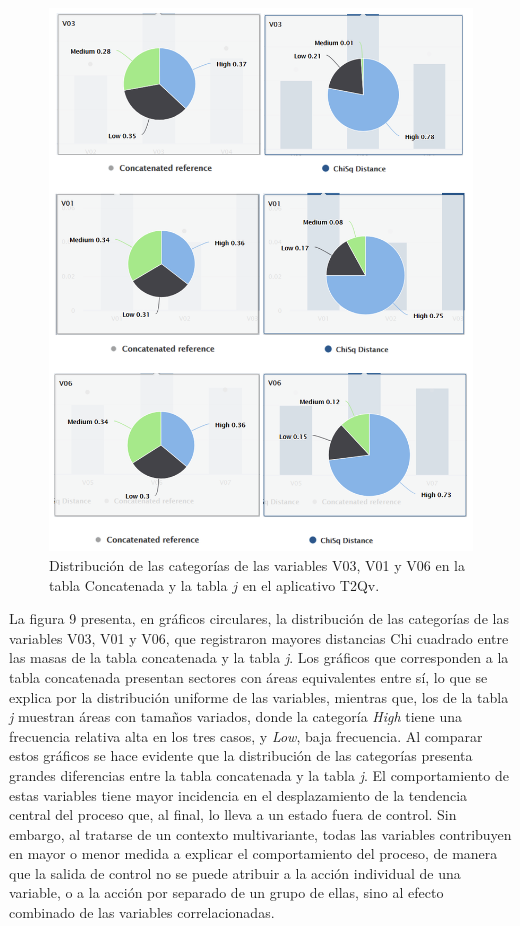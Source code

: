 \documentclass[mathematics,article,submit,moreauthors,pdftex]{mdpi}
\begin{document}
\begin{figure}[H]


\begin{center}\includegraphics[width=0.9\linewidth,]{distcomp} \end{center}

\caption{Distribución de las categorías de las variables V03, V01 y V06 en la tabla Concatenada y la tabla $j$ en el aplicativo T2Qv.}

\label{fig:distcomp}
\end{figure}

La figura 9 presenta, en gráficos circulares, la distribución de las
categorías de las variables V03, V01 y V06, que registraron mayores
distancias Chi cuadrado entre las masas de la tabla concatenada y la
tabla \emph{j}. Los gráficos que corresponden a la tabla concatenada
presentan sectores con áreas equivalentes entre sí, lo que se explica
por la distribución uniforme de las variables, mientras que, los de la
tabla \emph{j} muestran áreas con tamaños variados, donde la categoría
\emph{High} tiene una frecuencia relativa alta en los tres casos, y
\emph{Low}, baja frecuencia. Al comparar estos gráficos se hace evidente
que la distribución de las categorías presenta grandes diferencias entre
la tabla concatenada y la tabla \emph{j}. El comportamiento de estas
variables tiene mayor incidencia en el desplazamiento de la tendencia
central del proceso que, al final, lo lleva a un estado fuera de
control. Sin embargo, al tratarse de un contexto multivariante, todas
las variables contribuyen en mayor o menor medida a explicar el
comportamiento del proceso, de manera que la salida de control no se
puede atribuir a la acción individual de una variable, o a la acción por
separado de un grupo de ellas, sino al efecto combinado de las variables
correlacionadas.
\end{document}
